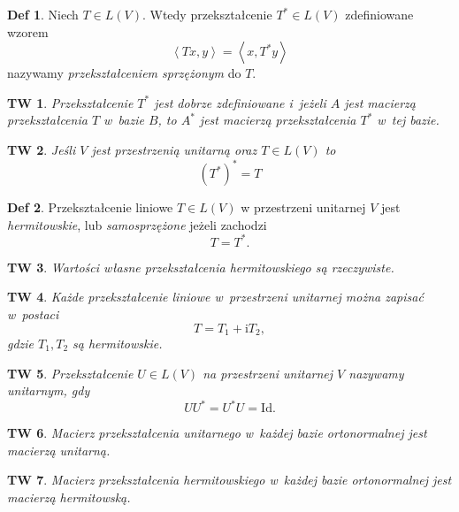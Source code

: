 \documentclass[a4paper, 12pt]{mwart}
\newcommand*{\iu}{\mathrm{i}}
\theoremstyle{definition}
\newtheorem{definicja}{Def}[section]
\theoremstyle{plain}
\newtheorem{twierdzenie}{TW}[section]
\theoremstyle{remark}
\begin{document}
\begin{definicja}
	Niech $T\in L(V)$. Wtedy przekształcenie $T^*\in L(V)$ zdefiniowane wzorem
	\begin{equation}
		\left<Tx, y\right> = \left<x, T^*y\right>
	\end{equation}
	nazywamy \emph{przekształceniem sprzężonym} do $T$.
\end{definicja}
\begin{twierdzenie}
	Przekształcenie $T^*$ jest dobrze zdefiniowane i~jeżeli $A$ jest macierzą przekształcenia $T$ w~bazie $B$, to $A^*$ jest macierzą przekształcenia $T^*$ w~tej bazie.
\end{twierdzenie}
\begin{twierdzenie}
	Jeśli $V$ jest przestrzenią unitarną oraz $T\in L(V)$ to
	\begin{equation}
		{(T^*)}^* = T
	\end{equation}
\end{twierdzenie}
\begin{definicja}
	Przekształcenie liniowe $T\in L(V)$ w przestrzeni unitarnej $V$ jest \emph{hermitowskie}, lub \emph{samosprzężone} jeżeli zachodzi
	\begin{equation}
		T = T^*.
	\end{equation}
\end{definicja}
\begin{twierdzenie}
	Wartości własne przekształcenia hermitowskiego są rzeczywiste.
\end{twierdzenie}
\begin{twierdzenie}
	Każde przekształcenie liniowe w~przestrzeni unitarnej można zapisać w~postaci
	\begin{equation}
		T = T_1 + \iu T_2,
	\end{equation}
	gdzie $T_1, T_2$ są hermitowskie.
\end{twierdzenie}
\begin{twierdzenie}
	Przekształcenie $U\in L(V)$ na przestrzeni unitarnej $V$ nazywamy \emph{unitarnym}, gdy
	\begin{equation}
		UU^* = U^*U = \mathrm{Id}.
	\end{equation}
\end{twierdzenie}
\begin{twierdzenie}
	Macierz przekształcenia unitarnego w~każdej bazie ortonormalnej jest macierzą unitarną.
\end{twierdzenie}
\begin{twierdzenie}
	Macierz przekształcenia hermitowskiego w~każdej bazie ortonormalnej jest macierzą hermitowską.
\end{twierdzenie}
\end{document}

